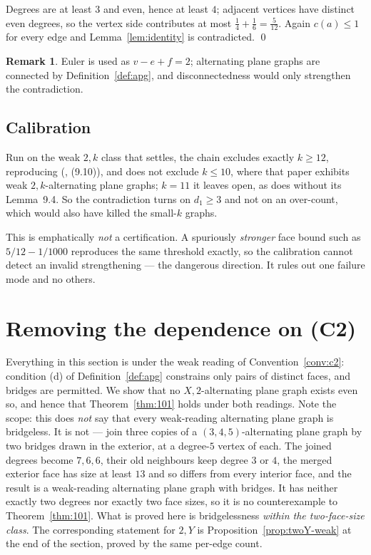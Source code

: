 \documentclass[11pt,a4paper]{amsart}
\theoremstyle{plain}
\theoremstyle{definition}
\newtheorem{remark}[theorem]{Remark}
\begin{document}
Degrees are at least $3$ and even, hence at least $4$; adjacent vertices have
distinct even degrees, so the vertex side contributes at most
$\tfrac14+\tfrac16 = \tfrac{5}{12}$. Again $c(a) \le 1$ for every edge and
Lemma~\ref{lem:identity} is contradicted. \qed

\begin{remark}
Euler is used as $v - e + f = 2$; alternating plane graphs are connected by
Definition~\ref{def:apg}, and disconnectedness would only strengthen the
contradiction.
\end{remark}

\subsection{Calibration}

Run on the weak $2,k$ class that \cite{AHSSV2015} settles, the chain excludes
exactly $k \ge 12$, reproducing (\cite{AHSSV2015}, (9.10)), and does not exclude
$k \le 10$, where that paper exhibits weak $2,k$-alternating plane graphs; $k =
11$ it leaves open, as does \cite{AHSSV2015} without its Lemma~9.4. So the
contradiction turns on $d_1 \ge 3$ and not on an over-count, which would also
have killed the small-$k$ graphs.

This is emphatically \emph{not} a certification. A spuriously \emph{stronger}
face bound such as $5/12 - 1/1000$ reproduces the same threshold exactly, so the
calibration cannot detect an invalid strengthening --- the dangerous direction.
It rules out one failure mode and no others.

\section{Removing the dependence on (C2)}\label{sec:c2}

Everything in this section is under the weak reading of
Convention~\ref{conv:c2}: condition (d) of Definition~\ref{def:apg} constrains
only pairs of distinct faces, and bridges are permitted. We show that no
$X,2$-alternating plane graph exists even so, and hence that
Theorem~\ref{thm:101} holds under both readings. Note the scope: this does
\emph{not} say that every weak-reading alternating plane graph is bridgeless.
It is not --- join three copies of a $(3,4,5)$-alternating plane graph by two
bridges drawn in the exterior, at a degree-$5$ vertex of each. The joined
degrees become $7,6,6$, their old neighbours keep degree $3$ or $4$, the merged
exterior face has size at least $13$ and so differs from every interior face,
and the result is a weak-reading alternating plane graph with bridges. It has
neither exactly two degrees nor exactly two face sizes, so it is no
counterexample to Theorem~\ref{thm:101}. What is proved here is bridgelessness
\emph{within the two-face-size class}. The corresponding statement for $2,Y$ is
Proposition~\ref{prop:twoY-weak} at the end of the section, proved by the same
per-edge count.
\end{document}
